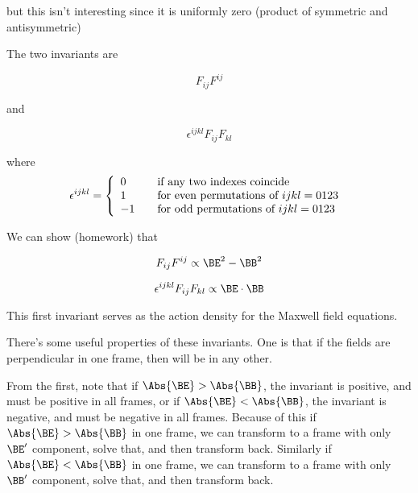 but this isn't interesting since it is uniformly zero (product of symmetric and antisymmetric)

The two invariants are

\begin{equation}\label{eqn:relativisticElectrodynamicsL11:570}
F_{ij}F^{ij}
\end{equation}

and 

\begin{equation}\label{eqn:relativisticElectrodynamicsL11:590}
\epsilon^{ijkl} F_{ij}F_{kl}
\end{equation}

where
\begin{equation}\label{eqn:relativisticElectrodynamicsL11:610}
\epsilon^{ijkl} =
\left\{
\begin{array}{l l}
0 & \quad \mbox{if any two indexes coincide} \\
1 & \quad \mbox{for even permutations of $ijkl=0123$ } \\
-1 & \quad \mbox{for odd permutations of $ijkl=0123$ } \\
\end{array}
\right.
\end{equation}

We can show (homework) that

\begin{equation}\label{eqn:relativisticElectrodynamicsL11:630}
F_{ij}F^{ij} \propto \BE^2 - \BB^2
\end{equation}

\begin{equation}\label{eqn:relativisticElectrodynamicsL11:650}
\epsilon^{ijkl} F_{ij}F_{kl} \propto \BE \cdot \BB
\end{equation}

This first invariant serves as the action density for the Maxwell field equations.

There's some useful properties of these invariants.  One is that if the fields are perpendicular in one frame, then will be in any other.  

From the first, note that if $\Abs{\BE} > \Abs{\BB}$, the invariant is positive, and must be positive in all frames, or if $\Abs{\BE} < \Abs{\BB}$, the invariant is negative, and must be negative in all frames.  Because of this if $\Abs{\BE} > \Abs{\BB}$ in one frame, we can transform to a frame with only $\BE'$ component, solve that, and then transform back.  Similarly if $\Abs{\BE} < \Abs{\BB}$ in one frame, we can transform to a frame with only $\BB'$ component, solve that, and then transform back.

